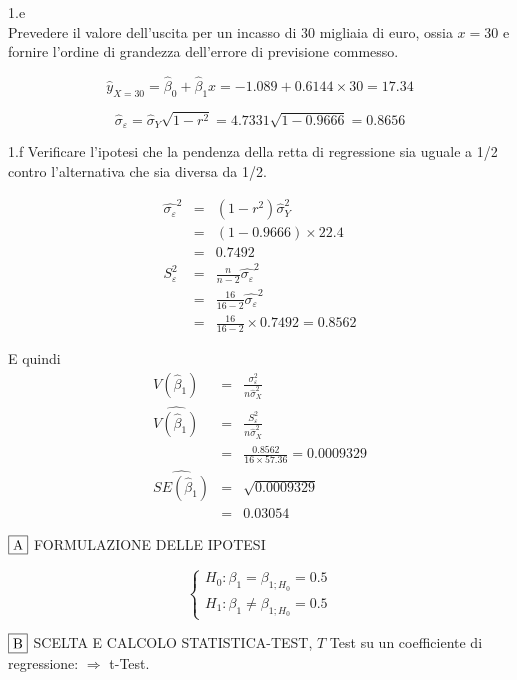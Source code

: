 \documentclass[
  11pt,
]{book}
\theoremstyle{mytheoremstyle}
\theoremstyle{mydefstyle}
\newenvironment{sol}
  {
  \begin{tcolorbox}[enhanced,breakable,arc=0.1mm,boxrule=1pt,colback=white,colframe=iblue,
  title=\bf \fontfamily{lmss}\selectfont \hspace{.5 cm} Soluzione,drop fuzzy shadow]

}{
\end{tcolorbox}
  }
\begin{document}
1.e\\
Prevedere il valore dell'uscita per
un incasso di 30 migliaia di euro, ossia \(x=30\) e fornire l'ordine di grandezza dell'errore
di previsione commesso.

\begin{sol}
\[\hat y_{X= 30 }=\hat\beta_0+\hat\beta_1 x= -1.089 + 0.6144 \times 30 = 17.34 \]

\[
\hat\sigma_{\varepsilon}=\hat\sigma_Y\sqrt{1-r^2}=
4.7331\sqrt{1-0.9666}=0.8656
\]

\end{sol}

1.f Verificare
l'ipotesi che la pendenza della retta di regressione sia uguale a
1/2 contro l'alternativa che sia diversa da 1/2.

\begin{sol}
\begin{eqnarray*}
\hat{\sigma_\varepsilon}^2&=&(1-r^2)\hat\sigma_Y^2\\
&=& (1- 0.9666 )\times 22.4 \\
   &=&  0.7492 \\
   S_\varepsilon^2 &=& \frac{n} {n-2} \hat{\sigma_\varepsilon}^2\\
   &=&  \frac{ 16 } { 16 -2} \hat{\sigma_\varepsilon}^2 \\
 &=&  \frac{ 16 } { 16 -2} \times  0.7492  =  0.8562  
\end{eqnarray*}

E quindi\begin{eqnarray*}
V(\hat\beta_{1}) &=& \frac{\sigma_{\varepsilon}^{2}} {n \hat{\sigma}^{2}_{X}} \\
\widehat{V(\hat\beta_{1})} &=& \frac{S_{\varepsilon}^{2}} {n \hat{\sigma}^{2}_{X}} \\
 &=& \frac{ 0.8562 } { 16 \times  57.36 } =  0.0009329 \\
 \widehat{SE(\hat\beta_{1})}        &=&  \sqrt{ 0.0009329 }\\
 &=&  0.03054 
\end{eqnarray*}

\(\fbox{A}\) FORMULAZIONE DELLE IPOTESI

\[\begin{cases}
   H_0: \beta_1 = \beta_{1;H_0}=0.5 \\
   H_1: \beta_1 \neq \beta_{1;H_0}=0.5 
   \end{cases}\]

\(\fbox{B}\) SCELTA E CALCOLO STATISTICA-TEST, \(T\)
Test su un coefficiente di regressione: \(\Rightarrow\) t-Test.


\end{sol}
\end{document}
